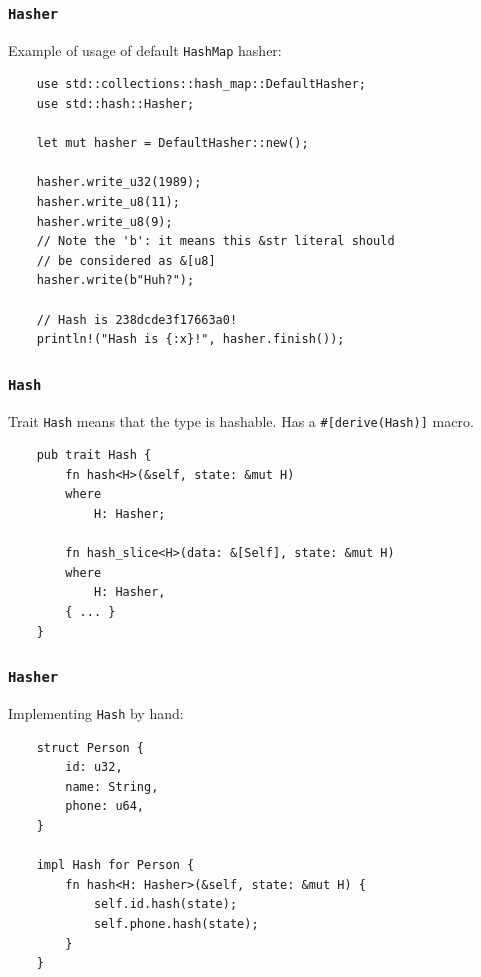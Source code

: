 \documentclass[aspectratio=1610,t]{beamer}
\begin{document}

\begin{frame}[fragile]
\frametitle{\texttt{Hasher}}
Example of usage of default \texttt{HashMap} hasher:

\begin{verbatim}
    use std::collections::hash_map::DefaultHasher;
    use std::hash::Hasher;

    let mut hasher = DefaultHasher::new();

    hasher.write_u32(1989);
    hasher.write_u8(11);
    hasher.write_u8(9);
    // Note the 'b': it means this &str literal should
    // be considered as &[u8]
    hasher.write(b"Huh?");

    // Hash is 238dcde3f17663a0!
    println!("Hash is {:x}!", hasher.finish());
\end{verbatim}
\end{frame}


\begin{frame}[fragile]
\frametitle{\texttt{Hash}}
Trait \texttt{Hash} means that the type is hashable. Has a \texttt{\#[derive(Hash)]} macro.

\begin{verbatim}
    pub trait Hash {
        fn hash<H>(&self, state: &mut H)
        where
            H: Hasher;

        fn hash_slice<H>(data: &[Self], state: &mut H)
        where
            H: Hasher,
        { ... }
    }
\end{verbatim}
\end{frame}


\begin{frame}[fragile]
\frametitle{\texttt{Hasher}}
Implementing \texttt{Hash} by hand:

\begin{verbatim}
    struct Person {
        id: u32,
        name: String,
        phone: u64,
    }

    impl Hash for Person {
        fn hash<H: Hasher>(&self, state: &mut H) {
            self.id.hash(state);
            self.phone.hash(state);
        }
    }
\end{verbatim}
\end{frame}
\end{document}
